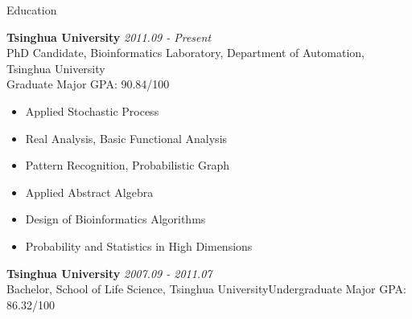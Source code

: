 \documentclass{resume} %
\begin{document}

\begin{rSection}{Education}

{\bf Tsinghua University} \hfill {\em 2011.09 - Present} \\
PhD Candidate, Bioinformatics Laboratory, Department of Automation, Tsinghua University\\
Graduate Major GPA: 90.84/100
\vspace{-3mm}
\begin{multicols}{2}
  \begin{itemize}
\item Applied Stochastic Process
\item Real Analysis, Basic Functional Analysis
\item Pattern Recognition, Probabilistic Graph
\item Applied Abstract Algebra
\item Design of Bioinformatics Algorithms
\item Probability and Statistics in High Dimensions
  \end{itemize}
\end{multicols}
\vspace{-3mm}

{\bf Tsinghua University} \hfill {\em 2007.09 - 2011.07} \\
{Bachelor, School of Life Science, Tsinghua University}\hfill {Undergraduate Major GPA: 86.32/100}
\end{rSection}
\end{document}
